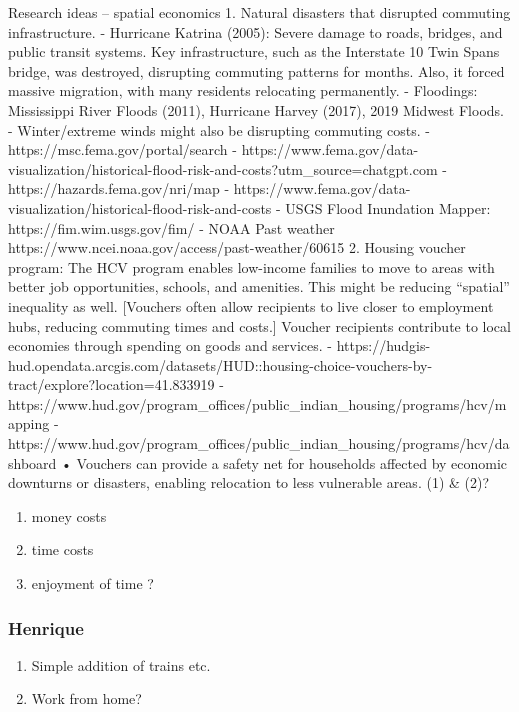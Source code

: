 \documentclass{article}
\begin{document}
Research ideas – spatial economics 
1.	Natural disasters that disrupted commuting infrastructure. 
-	Hurricane Katrina (2005): Severe damage to roads, bridges, and public transit systems. Key infrastructure, such as the Interstate 10 Twin Spans bridge, was destroyed, disrupting commuting patterns for months. Also, it forced massive migration, with many residents relocating permanently.
-	Floodings: Mississippi River Floods (2011), Hurricane Harvey (2017), 2019 Midwest Floods. 
-	Winter/extreme winds might also be disrupting commuting costs. 
-	https://msc.fema.gov/portal/search
-	https://www.fema.gov/data-visualization/historical-flood-risk-and-costs?utm_source=chatgpt.com 
-	https://hazards.fema.gov/nri/map 
-	https://www.fema.gov/data-visualization/historical-flood-risk-and-costs
-	USGS Flood Inundation Mapper: https://fim.wim.usgs.gov/fim/ 
-	NOAA Past weather https://www.ncei.noaa.gov/access/past-weather/60615 
2.	Housing voucher program: The HCV program enables low-income families to move to areas with better job opportunities, schools, and amenities. This might be reducing “spatial” inequality as well. [Vouchers often allow recipients to live closer to employment hubs, reducing commuting times and costs.] Voucher recipients contribute to local economies through spending on goods and services. 
-	https://hudgis-hud.opendata.arcgis.com/datasets/HUD::housing-choice-vouchers-by-tract/explore?location=41.833919%
-	https://www.hud.gov/program_offices/public_indian_housing/programs/hcv/mapping 
-	https://www.hud.gov/program_offices/public_indian_housing/programs/hcv/dashboard 
•	Vouchers can provide a safety net for households affected by economic downturns or disasters, enabling relocation to less vulnerable areas. (1) & (2)?


\begin{enumerate}
\item money costs
\item time costs
\item enjoyment of time ? 

\end{enumerate}
\subsubsection{Henrique}
\begin{enumerate}
\item Simple addition of trains etc.
\item Work from home? 
\end{enumerate}
\end{document}
